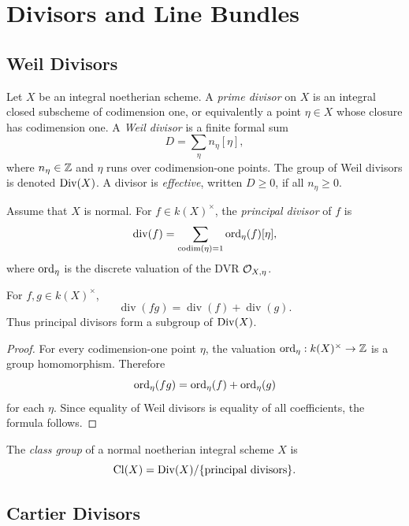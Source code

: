 \chapter{Divisors and Line Bundles}

\section{Weil Divisors}

\begin{definition}
Let \(X\) be an integral noetherian scheme.  A \emph{prime divisor} on \(X\) is
an integral closed subscheme of codimension one, or equivalently a point
\(\eta\in X\) whose closure has codimension one.  A \emph{Weil divisor} is a
finite formal sum
\[
    D=\sum_\eta n_\eta[\eta],
\]
where \(n_\eta\in\mathbb{Z}\) and \(\eta\) runs over codimension-one points.  The group
of Weil divisors is denoted \(\operatorname{Div}(X)\).  A divisor is \emph{effective}, written
\(D\ge0\), if all \(n_\eta\ge0\).
\end{definition}

\begin{definition}
Assume that \(X\) is normal.  For \(f\in k(X)^\times\), the
\emph{principal divisor} of \(f\) is
\[
    \operatorname{div}(f)=
    \sum_{\operatorname{codim}(\eta)=1}\operatorname{ord}_\eta(f)[\eta],
\]
where \(\operatorname{ord}_\eta\) is the discrete valuation of the DVR \(\mathcal{O}_{X,\eta}\).
\end{definition}

\begin{proposition}
For \(f,g\in k(X)^\times\),
\[
    \operatorname{div}(fg)=\operatorname{div}(f)+\operatorname{div}(g).
\]
Thus principal divisors form a subgroup of \(\operatorname{Div}(X)\).
\end{proposition}

\begin{proof}
For every codimension-one point \(\eta\), the valuation
\(\operatorname{ord}_\eta:k(X)^\times\to\mathbb{Z}\) is a group homomorphism.  Therefore
\[
    \operatorname{ord}_\eta(fg)=\operatorname{ord}_\eta(f)+\operatorname{ord}_\eta(g)
\]
for each \(\eta\).  Since equality of Weil divisors is equality of all
coefficients, the formula follows.
\end{proof}

\begin{definition}
The \emph{class group} of a normal noetherian integral scheme \(X\) is
\[
    \operatorname{Cl}(X)=\operatorname{Div}(X)/\{\text{principal divisors}\}.
\]
\end{definition}

\section{Cartier Divisors}

